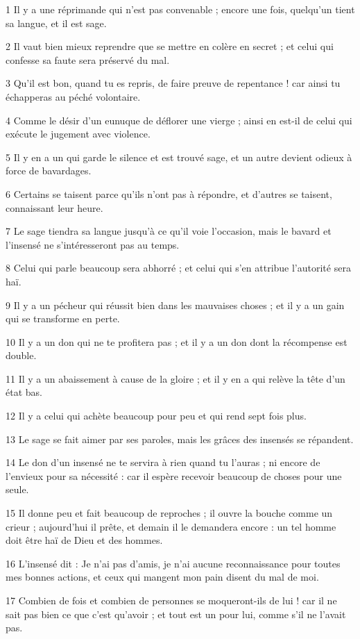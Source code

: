 \par 1 Il y a une réprimande qui n'est pas convenable ; encore une fois, quelqu'un tient sa langue, et il est sage.
\par 2 Il vaut bien mieux reprendre que se mettre en colère en secret ; et celui qui confesse sa faute sera préservé du mal.
\par 3 Qu'il est bon, quand tu es repris, de faire preuve de repentance ! car ainsi tu échapperas au péché volontaire.
\par 4 Comme le désir d'un eunuque de déflorer une vierge ; ainsi en est-il de celui qui exécute le jugement avec violence.
\par 5 Il y en a un qui garde le silence et est trouvé sage, et un autre devient odieux à force de bavardages.
\par 6 Certains se taisent parce qu'ils n'ont pas à répondre, et d'autres se taisent, connaissant leur heure.
\par 7 Le sage tiendra sa langue jusqu'à ce qu'il voie l'occasion, mais le bavard et l'insensé ne s'intéresseront pas au temps.
\par 8 Celui qui parle beaucoup sera abhorré ; et celui qui s'en attribue l'autorité sera haï.
\par 9 Il y a un pécheur qui réussit bien dans les mauvaises choses ; et il y a un gain qui se transforme en perte.
\par 10 Il y a un don qui ne te profitera pas ; et il y a un don dont la récompense est double.
\par 11 Il y a un abaissement à cause de la gloire ; et il y en a qui relève la tête d'un état bas.
\par 12 Il y a celui qui achète beaucoup pour peu et qui rend sept fois plus.
\par 13 Le sage se fait aimer par ses paroles, mais les grâces des insensés se répandent.
\par 14 Le don d'un insensé ne te servira à rien quand tu l'auras ; ni encore de l'envieux pour sa nécessité : car il espère recevoir beaucoup de choses pour une seule.
\par 15 Il donne peu et fait beaucoup de reproches ; il ouvre la bouche comme un crieur ; aujourd'hui il prête, et demain il le demandera encore : un tel homme doit être haï de Dieu et des hommes.
\par 16 L'insensé dit : Je n'ai pas d'amis, je n'ai aucune reconnaissance pour toutes mes bonnes actions, et ceux qui mangent mon pain disent du mal de moi.
\par 17 Combien de fois et combien de personnes se moqueront-ils de lui ! car il ne sait pas bien ce que c'est qu'avoir ; et tout est un pour lui, comme s'il ne l'avait pas.
